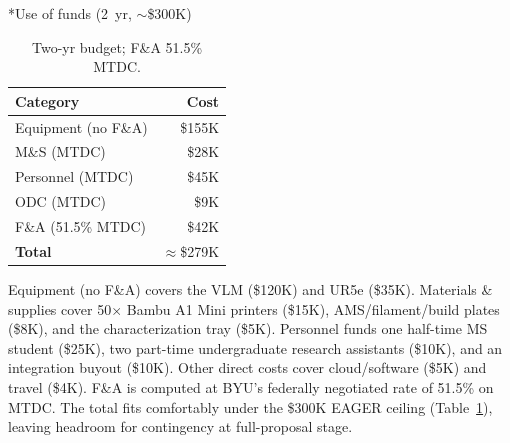 \documentclass[11pt]{article}
\makeatletter
\renewcommand{\section}{\@startsection{section}{1}{0pt}{1.0ex plus 0.3ex}{0.3ex}{\normalfont\bfseries}}
\makeatother
\begin{document}
\section*{Use of funds (2~yr, $\sim$\$300K)}
\begin{table}
\vspace{-\intextsep}
\centering
\scriptsize
\setlength{\tabcolsep}{3pt}
\renewcommand{\arraystretch}{0.9}
\captionsetup{font=scriptsize,skip=1pt,belowskip=0pt}
\begin{tabular}{@{}lr@{}}
\hline
\textbf{Category} & \textbf{Cost} \\
\hline
Equipment (no F\&A) & \$155K \\
M\&S (MTDC) & \$28K \\
Personnel (MTDC) & \$45K \\
ODC (MTDC) & \$9K \\
F\&A (51.5\% MTDC) & \$42K \\
\hline
\textbf{Total} & $\approx$\$279K \\
\hline
\end{tabular}
\caption{Two-yr budget; F\&A 51.5\% MTDC.}
\label{tab:budget}
\vspace{-1.5\baselineskip}
\end{table}
Equipment (no F\&A) covers the VLM (\$120K) and UR5e (\$35K). Materials \& supplies cover 50$\times$ Bambu A1 Mini printers (\$15K), AMS/filament/build plates (\$8K), and the characterization tray (\$5K). Personnel funds one half-time MS student (\$25K), two part-time undergraduate research assistants (\$10K), and an integration buyout (\$10K). Other direct costs cover cloud/software (\$5K) and travel (\$4K). F\&A is computed at BYU's federally negotiated rate of 51.5\% on MTDC. The total fits comfortably under the \$300K EAGER ceiling (Table~\ref{tab:budget}), leaving headroom for contingency at full-proposal stage.
\end{document}
